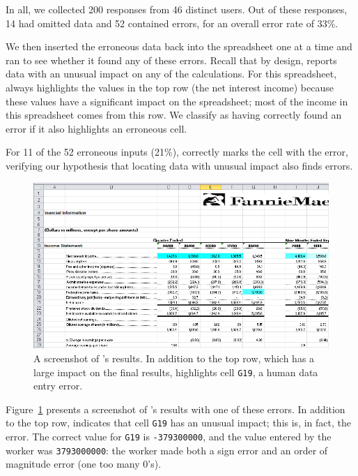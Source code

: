 In all, we collected 200 responses from 46 distinct users. Out of
these responses, 14 had omitted data and 52 contained errors, for an
overall error rate of 33\%.

We then inserted the erroneous data back into the spreadsheet one at a
time and ran \checkcell{} to see whether it found any of these
errors. Recall that by design, \checkcell{} reports data with an
unusual impact on any of the calculations. For this
spreadsheet, \checkcell{} always highlights the values in the top row
(the net interest income) because these values have a significant
impact on the spreadsheet; most of the income in this spreadsheet
comes from this row. We classify \checkcell{} as having correctly
found an error if it also highlights an erroneous cell.

For 11 of the 52 erroneous inputs (21\%), \checkcell{} correctly marks the
cell with the error, verifying our hypothesis that locating data with
unusual impact also finds errors.

\begin{figure}[!t]
\centering
\includegraphics[width=5in]{images/fannie_mae_outlier}
  \caption{A screenshot of \checkcell{}'s results. In addition to the top row, which has a large impact on the final results, \checkcell{} highlights cell \texttt{G19}, a human data entry error.\label{fig:fannie_mae}}
\end{figure}


Figure~\ref{fig:fannie_mae} presents a screenshot of \checkcell{}'s
results with one of these errors. In addition to the top
row, \checkcell{} indicates that cell \texttt{G19} has an unusual
impact; this is, in fact, the error. The correct value
for \texttt{G19} is \texttt{-379300000}, and the value entered by the
worker was \texttt{3793000000}: the worker made both a sign error and
an order of magnitude error (one too many 0's).

